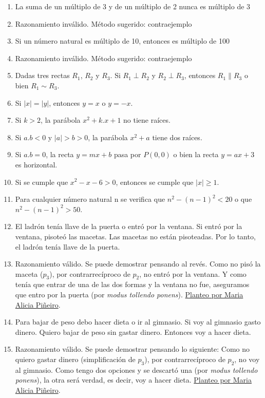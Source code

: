 \documentclass[a4paper]{article}
\newcommand{\answer}{\item[**]}
\begin{document}
\begin{enumerate}
\begin{enumerate} [label=(\alph*)]
		\item La suma de un múltiplo de 3 y de un múltiplo de 2 nunca es múltiplo de 3
		\answer Razonamiento inválido. Método sugerido: contraejemplo
		
		\item Si un número natural es múltiplo de 10, entonces es múltiplo de 100
		\answer Razonamiento inválido. Método sugerido: contraejemplo

		\item Dadas tres rectas $R_1$, $R_2$ y $R_3$. Si $R_1 \perp  R_2$ y $R_2 \perp  R_3$, entonces $R_1 \parallel  R_3$ o bien $R_1 \sim R_3$.

		\item Si $|x| = |y|$, entonces  $y=x$ o $y=-x$.

		\item Si $k>2$, la parábola $x^2+k.x+1$ no tiene raíces.

		\item Si $a.b < 0$ y $|a|>b>0$, la parábola $x^2+a$ tiene dos raíces.

		\item Si $a.b = 0$, la recta $y=mx+b$ pasa por $P(0,0)$ o bien la recta $y=ax+3$ es horizontal.

		\item Si se cumple que $x^2-x-6>0$, entonces se cumple que $|x|\geq 1$.

		\item Para cualquier número natural n se verifica que $n^2 - (n-1)^2 < 20$  o que  $n^2 - (n-1)^2 >50$.

		\item El ladrón tenía llave de la puerta o entró por la ventana. Si entró por la ventana, pisoteó las macetas. Las macetas no están pisoteadas. Por lo tanto, el ladrón tenía llave de la puerta.
		\answer Razonamiento válido. Se puede demostrar pensando al revés. Como no pisó la maceta ($p_3$), por contrarrecíproco de $p_2$, no entró por la ventana. Y como tenía que entrar de una de las dos formas y la ventana no fue, aseguramos que entro por la puerta (por \textit{modus tollendo ponens}).  \href{https://youtu.be/DD5EleyOl-0?t=74}{Planteo por Maria Alicia Piñeiro}.

		\item Para bajar de peso debo hacer dieta o ir al gimnasio. Si voy al gimnasio gasto dinero. Quiero bajar de peso sin gastar dinero. Entonces voy a hacer dieta. 
		\answer Razonamiento válido. Se puede demostrar pensando lo siguiente: Como no quiero gastar dinero (simplificación de $p_3$), por contrarrecíproco de $p_2$, no voy al gimnasio. Como tengo dos opciones y se descartó una (por \textit{modus tollendo ponens}), la otra será verdad, es decir, voy a hacer dieta. \href{https://youtu.be/DD5EleyOl-0?t=255}{Planteo por Maria Alicia Piñeiro}.


\end{enumerate}
\end{enumerate}
\end{document}
